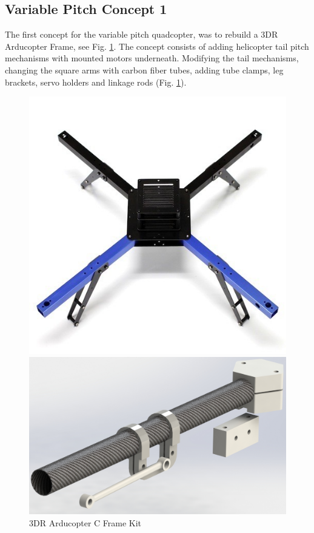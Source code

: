 \newpage
\subsection{Variable Pitch Concept 1}

The first concept for the variable pitch quadcopter, was to rebuild a 3DR Arducopter Frame, see Fig. \ref{fig:Arducopter}. The concept consists of adding helicopter tail pitch mechanisms with mounted motors underneath. Modifying the tail mechanisms, changing the square arms with carbon fiber tubes, adding tube clamps, leg brackets, servo holders and linkage rods (Fig. \ref{fig:Arducopter}). 
\begin{figure}[h]
        \centering
         \begin{minipage}[b]{0,35\textwidth}
            \includegraphics[width =\textwidth, angle =0]{VAPIQ-PICTURES/3DRArducopterCframeKit}
              \caption{3DR Arducopter C Frame Kit}
           \label{fig:Arducopter}
        \end{minipage}
        \hfill
        \begin{minipage}[b]{0.35\textwidth}
            \includegraphics[width = \textwidth]{VAPIQ-PICTURES/ModForVPQ}

\end{minipage}
\end{figure}
